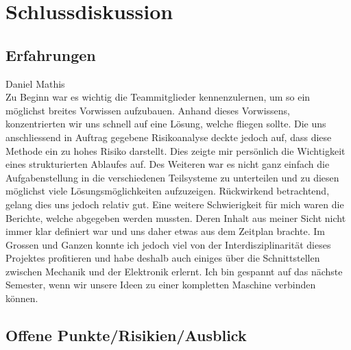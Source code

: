 \section{Schlussdiskussion}

\subsection{Erfahrungen}

Daniel Mathis\\
Zu Beginn war es wichtig die Teammitglieder kennenzulernen, um so ein möglichst breites Vorwissen aufzubauen. Anhand dieses Vorwissens, konzentrierten wir uns schnell auf eine Lösung, welche fliegen sollte. Die uns anschliessend in Auftrag gegebene Risikoanalyse deckte jedoch auf, dass diese Methode ein zu hohes Risiko darstellt. Dies zeigte mir persönlich die Wichtigkeit eines strukturierten Ablaufes auf. Des Weiteren war es nicht ganz einfach die Aufgabenstellung in die verschiedenen Teilsysteme zu unterteilen und zu diesen möglichst viele Lösungsmöglichkeiten aufzuzeigen. Rückwirkend betrachtend, gelang dies uns jedoch relativ gut. Eine weitere Schwierigkeit für mich waren die Berichte, welche abgegeben werden mussten. Deren Inhalt aus meiner Sicht nicht immer klar definiert war und uns daher etwas aus dem Zeitplan brachte. Im Grossen und Ganzen konnte ich jedoch viel von der Interdisziplinarität dieses Projektes profitieren und habe deshalb auch einiges über die Schnittstellen zwischen Mechanik und der Elektronik erlernt. Ich bin gespannt auf das nächste Semester, wenn wir unsere Ideen zu einer kompletten Maschine verbinden können.


\subsection{Offene Punkte/Risikien/Ausblick}